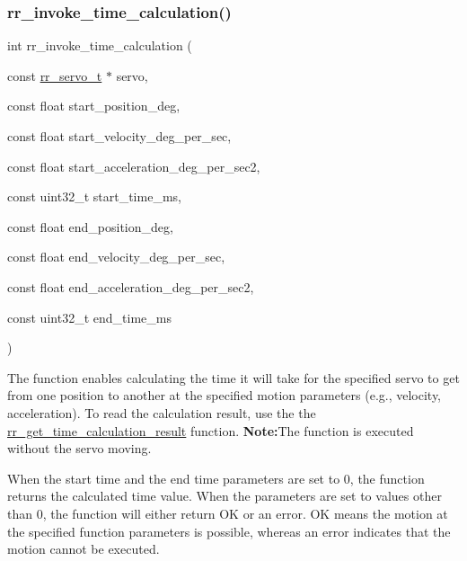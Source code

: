\subsubsection{\texorpdfstring{rr\+\_\+invoke\+\_\+time\+\_\+calculation()}{rr\_invoke\_time\_calculation()}}
{\footnotesize\ttfamily int rr\+\_\+invoke\+\_\+time\+\_\+calculation (\begin{DoxyParamCaption}\item[{const \hyperlink{structrr__servo__t}{rr\+\_\+servo\+\_\+t} $\ast$}]{servo,  }\item[{const float}]{start\+\_\+position\+\_\+deg,  }\item[{const float}]{start\+\_\+velocity\+\_\+deg\+\_\+per\+\_\+sec,  }\item[{const float}]{start\+\_\+acceleration\+\_\+deg\+\_\+per\+\_\+sec2,  }\item[{const uint32\+\_\+t}]{start\+\_\+time\+\_\+ms,  }\item[{const float}]{end\+\_\+position\+\_\+deg,  }\item[{const float}]{end\+\_\+velocity\+\_\+deg\+\_\+per\+\_\+sec,  }\item[{const float}]{end\+\_\+acceleration\+\_\+deg\+\_\+per\+\_\+sec2,  }\item[{const uint32\+\_\+t}]{end\+\_\+time\+\_\+ms }\end{DoxyParamCaption})}



The function enables calculating the time it will take for the specified servo to get from one position to another at the specified motion parameters (e.\+g., velocity, acceleration). To read the calculation result, use the the \hyperlink{group___trajectory_ga0d01b53187b97dacd7611dacb37024d8}{rr\+\_\+get\+\_\+time\+\_\+calculation\+\_\+result} function. {\bfseries Note\+:}The function is executed without the servo moving.~\newline
 

When the start time and the end time parameters are set to 0, the function returns the calculated time value. When the parameters are set to values other than 0, the function will either return OK or an error. \textquotesingle{}OK\textquotesingle{} means the motion at the specified function parameters is possible, whereas an error indicates that the motion cannot be executed.


